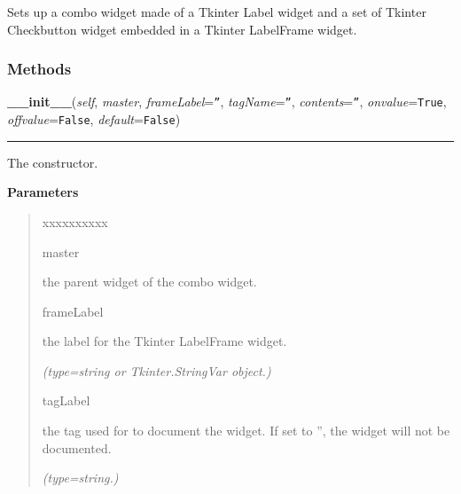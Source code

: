 Sets up a combo widget made of a Tkinter Label widget and a set of Tkinter 
Checkbutton widget embedded in a Tkinter LabelFrame widget.



  \subsubsection{Methods}

    \vspace{0.5ex}

\hspace{.8\funcindent}\begin{boxedminipage}{\funcwidth}

    \raggedright \textbf{\_\_init\_\_}(\textit{self}, \textit{master}, \textit{frameLabel}={\tt ''}, \textit{tagName}={\tt ''}, \textit{contents}={\tt ''}, \textit{onvalue}={\tt True}, \textit{offvalue}={\tt False}, \textit{default}={\tt False})

    \vspace{-1.5ex}

    \rule{\textwidth}{0.5\fboxrule}
\setlength{\parskip}{2ex}
    The constructor.

\setlength{\parskip}{1ex}
      \textbf{Parameters}
      \vspace{-1ex}

      \begin{quote}
        \begin{Ventry}{xxxxxxxxxx}

          \item[master]

          the parent widget of the combo widget.

          \item[frameLabel]

          the label for the Tkinter LabelFrame widget.

            {\it (type=string or Tkinter.StringVar object.)}

          \item[tagLabel]

          the tag used for to document the widget. If set to '', the widget
          will not be documented.

            {\it (type=string.)}


\end{Ventry}
\end{quote}
\end{boxedminipage}

